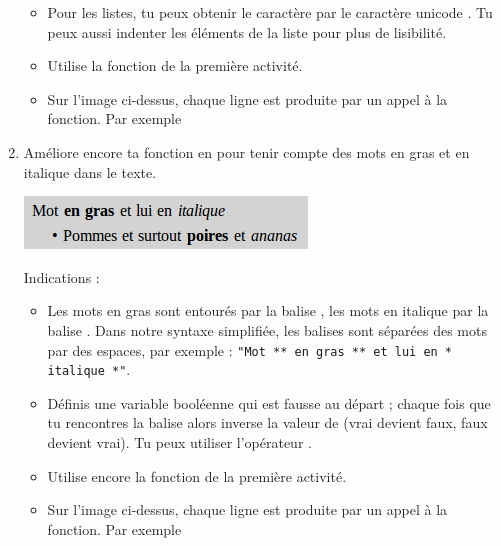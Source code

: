\documentclass[11pt,class=report,crop=false]{standalone}
\begin{document}
\begin{activite}
\begin{enumerate}
\begin{itemize}
    \item Pour les listes, tu peux obtenir le caractère \og{}\textbullet\fg{} par le caractère unicode . Tu peux aussi indenter les éléments de la liste pour plus de lisibilité.
    
    \item Utilise la fonction  de la première activité.
    
    \item Sur l'image ci-dessus, chaque ligne est produite par un appel à la fonction. Par exemple 
   \end{itemize}


  \item Améliore encore ta fonction en  pour tenir compte des mots en gras et en italique dans le texte.
  
\begin{center}
\includegraphics[scale=0.7]{ecran-markdown-5}
\end{center}   
 
   Indications :
  \begin{itemize}
    \item Les mots en gras sont entourés par la balise \ci{**}, les mots en italique par la balise \ci{*}. Dans notre syntaxe simplifiée, les balises sont séparées des mots par des espaces, par exemple : \lstinline!"Mot ** en gras ** et lui en * italique *"!.
    
    
    \item Définis une variable booléenne  qui est fausse au départ ; chaque fois que tu rencontres la balise \ci{**} alors inverse la valeur de  (\og{}vrai\fg{} devient \og{}faux\fg{}, \og{}faux\fg{} devient \og{}vrai\fg{}). Tu peux utiliser l'opérateur .
    
    \item Utilise encore la fonction  de la première activité.
    
    \item Sur l'image ci-dessus, chaque ligne est produite par un appel à la fonction. Par exemple 
   \end{itemize} 
   

\end{enumerate}
\end{activite}
\end{document}
